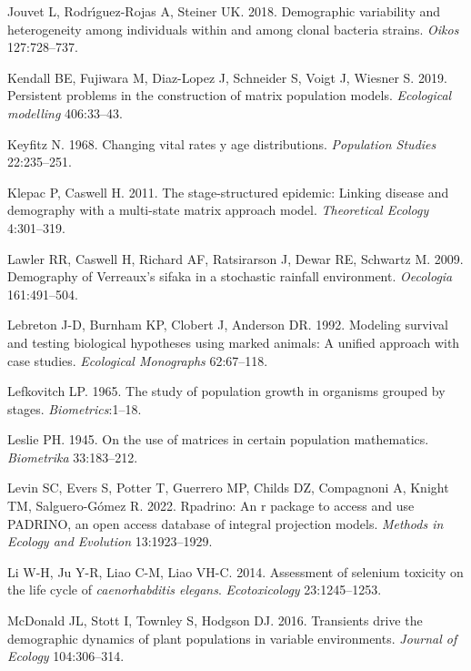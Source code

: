 \documentclass[
  12pt,
  letterpaper,
]{book}
\newlength{\cslhangindent}
\newenvironment{CSLReferences}[2] %
 {\begin{list}{}{%
  \setlength{\itemindent}{0pt}
  \setlength{\leftmargin}{0pt}
  \setlength{\parsep}{0pt}
  \ifodd #1
   \setlength{\leftmargin}{\cslhangindent}
   \setlength{\itemindent}{-1\cslhangindent}
  \fi
  \setlength{\itemsep}{#2\baselineskip}}}
 {\end{list}}
\begin{document}
\begin{CSLReferences}{1}{0}
Jouvet L, Rodrı́guez-Rojas A, Steiner UK. 2018. Demographic variability
and heterogeneity among individuals within and among clonal bacteria
strains. \emph{Oikos} 127:728--737.

Kendall BE, Fujiwara M, Diaz-Lopez J, Schneider S, Voigt J, Wiesner S.
2019. Persistent problems in the construction of matrix population
models. \emph{Ecological modelling} 406:33--43.

Keyfitz N. 1968. Changing vital rates y age distributions.
\emph{Population Studies} 22:235--251.

Klepac P, Caswell H. 2011. The stage-structured epidemic: Linking
disease and demography with a multi-state matrix approach model.
\emph{Theoretical Ecology} 4:301--319.

Lawler RR, Caswell H, Richard AF, Ratsirarson J, Dewar RE, Schwartz M.
2009. Demography of {V}erreaux's sifaka in a stochastic rainfall
environment. \emph{Oecologia} 161:491--504.

Lebreton J-D, Burnham KP, Clobert J, Anderson DR. 1992. Modeling
survival and testing biological hypotheses using marked animals: A
unified approach with case studies. \emph{Ecological Monographs}
62:67--118.

Lefkovitch LP. 1965. The study of population growth in organisms grouped
by stages. \emph{Biometrics}:1--18.

Leslie PH. 1945. On the use of matrices in certain population
mathematics. \emph{Biometrika} 33:183--212.

Levin SC, Evers S, Potter T, Guerrero MP, Childs DZ, Compagnoni A,
Knight TM, Salguero-Gómez R. 2022. Rpadrino: An r package to access and
use PADRINO, an open access database of integral projection models.
\emph{Methods in Ecology and Evolution} 13:1923--1929.

Li W-H, Ju Y-R, Liao C-M, Liao VH-C. 2014. Assessment of selenium
toxicity on the life cycle of \emph{caenorhabditis {e}legans}.
\emph{Ecotoxicology} 23:1245--1253.

McDonald JL, Stott I, Townley S, Hodgson DJ. 2016. Transients drive the
demographic dynamics of plant populations in variable environments.
\emph{Journal of Ecology} 104:306--314.


\end{CSLReferences}
\end{document}
